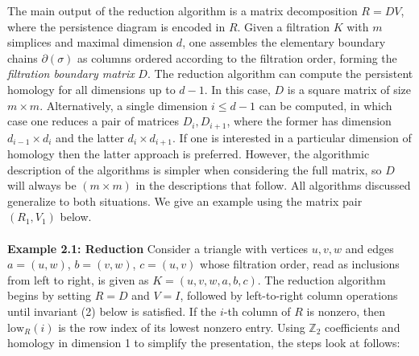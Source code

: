 \documentclass{siamart190516}
\begin{document}
 The main output of the reduction algorithm is a matrix decomposition $R = D V$, where the persistence diagram is encoded in $R$. 
 Given a  filtration $K$ with $m$ simplices and maximal dimension $d$, 
 one assembles the elementary boundary chains $\partial(\sigma)$ as columns ordered according to the filtration order, forming the \emph{filtration boundary matrix} $D$. 
 The reduction algorithm can  compute the persistent homology for all dimensions up to $d - 1$.
 In this case,  $D$ is a square matrix of size $m \times m$. Alternatively, a single dimension $i \leq d - 1$ can be computed, in which case one reduces a pair of matrices $D_i, D_{i+1}$, where the former has dimension $d_{i-1} \times d_i$ and the latter $d_{i} \times d_{i+1}$. If one is interested in a particular dimension of homology then the latter approach is preferred. However, the algorithmic description of the algorithms is simpler when considering the full matrix, so $D$ will always be $(m \times m)$ in the descriptions that follow. All algorithms discussed generalize to both situations. We give an example using the matrix pair $(R_1, V_1)$  below. 
\\
\\
\noindent
\textbf{Example 2.1: Reduction} Consider a triangle with vertices $u,v,w$ and edges $a = (u,w)$, $b = (v,w)$, $c = (u, v)$ whose filtration order, read as inclusions from left to right, is given as $K = (u, v, w, a, b, c)$. The reduction algorithm begins by setting $R = D$ and $V = I$, followed by left-to-right column operations until invariant (2) below is satisfied.
If the $i$-th column of $R$ is nonzero, then $\mathrm{low}_R(i)$ 
is the row index of its lowest nonzero entry.
Using $\mathbb{Z}_2$ coefficients and homology in dimension 1 to simplify the presentation, the steps look at follows:
\end{document}
